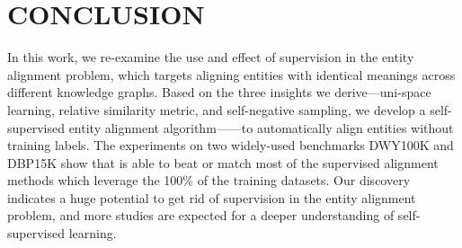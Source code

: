 \section{CONCLUSION}
In this work, we re-examine the use and effect of supervision in the entity alignment problem, which targets aligning entities with identical meanings across different knowledge graphs. Based on the three insights we derive---uni-space learning, relative similarity metric, and self-negative sampling, we develop a self-supervised entity alignment algorithm---\solution---to automatically align entities without training labels. The experiments on two widely-used benchmarks DWY100K and DBP15K show that \solution is able to beat or match most of the supervised alignment methods which leverage the 100\% of the training datasets. Our discovery indicates a huge potential to get rid of supervision in the entity alignment problem, and more studies are expected for a deeper understanding of self-supervised learning.